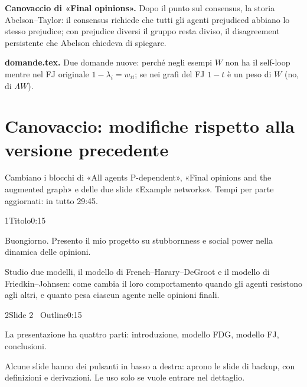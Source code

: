 \par\smallskip\noindent \textbf{Canovaccio di «Final opinions».} Dopo il punto sul consensus, la storia Abelson--Taylor: il consensus richiede che tutti gli agenti prejudiced abbiano lo stesso prejudice; con prejudice diversi il gruppo resta diviso, il disagreement persistente che Abelson chiedeva di spiegare.\par
\par\smallskip\noindent \textbf{domande.tex.} Due domande nuove: perché negli esempi $W$ non ha il self-loop mentre nel FJ originale $1 - \lambda_i = w_{ii}$; se nei grafi del FJ $1 - t$ è un peso di $W$ (no, di $\Lambda W$).\par
\clearpage
\section*{Canovaccio: modifiche rispetto alla versione precedente}
Cambiano i blocchi di «All agents P-dependent», «Final opinions and the augmented graph» e delle due slide «Example networks». Tempi per parte aggiornati: in tutto 29:45.
\begin{slidepag}{1}{Titolo}{0:15}
  \begin{discorso}
    \item Buongiorno. Presento il mio progetto su stubbornness e social power nella dinamica delle opinioni.
    \item Studio due modelli, il modello di French–Harary–DeGroot e il modello di Friedkin–Johnsen: come cambia il loro comportamento quando gli agenti resistono agli altri, e quanto pesa ciascun agente nelle opinioni finali.
  \end{discorso}
\end{slidepag}

\begin{slidepag}{2}{Slide 2 \textperiodcentered\ Outline}{0:15}
  \begin{discorso}
    \item La presentazione ha quattro parti: introduzione, modello FDG, modello FJ, conclusioni.
    \item Alcune slide hanno dei pulsanti in basso a destra: aprono le slide di backup, con definizioni e derivazioni. Le uso solo se vuole entrare nel dettaglio.
  \end{discorso}
\end{slidepag}

